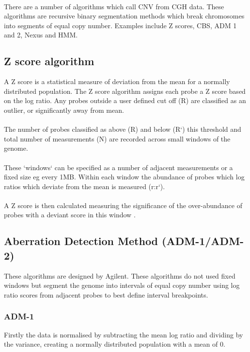 \paragraph*{}
There are a number of algorithms which call \ac{CNV} from \ac{CGH} data. These algorithms are recursive binary segmentation methods which break chromosomes into segments of equal copy number. Examples include Z scores, \ac{CBS}, \ac{ADM} 1 and 2, Nexus and \ac{HMM}. 

\subsection{Z score algorithm}
A Z score is a statistical measure of deviation from the mean for a normally distributed population. The Z score algorithm assigns each probe a Z score based on the log ratio. Any probes outside a user defined cut off (R) are classified as an outlier, or significantly away from mean. 
\paragraph*{}
The number of probes classified as above (R) and below (R`) this threshold and total number of measurements (N) are recorded across small windows of the genome. 
\paragraph*{}
These `windows` can be specified as a number of adjacent measurements or a fixed size eg every 1MB. Within each window the abundance of probes which log ratios which deviate from the mean is measured (r:r`).
\paragraph*{}
A Z score is then calculated measuring the significance of the over-abundance of probes with a deviant score in this window \cite{agilent_technologies_agilent_2011}.

\subsection{Aberration Detection Method (ADM-1/ADM-2)}
These algorithms are designed by Agilent\cite{agilent_technologies_agilent_2011}. These algorithms do not used fixed windows but segment the genome into intervals of equal copy number using log ratio scores from adjacent probes to best define interval breakpoints.

\subsubsection{ADM-1}
Firstly the data is normalised by subtracting the mean log ratio and dividing by the variance, creating a normally distributed population with a mean of 0. 

